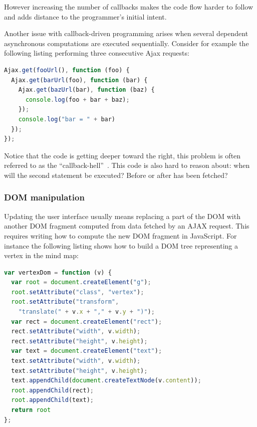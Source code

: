 \documentclass[american,english,runningheads]{llncs}
\begin{document}
However increasing the number of callbacks makes the code flow harder to follow and adds distance to the programmer's
initial intent.

Another issue with callback-driven programming arises when several dependent asynchronous computations are executed
sequentially. Consider for example the following listing performing three consecutive Ajax requests:

\begin{lstlisting}[language=JavaScript,label=async-callback-hell,caption=Sequential asynchronous calls]
Ajax.get(fooUrl(), function (foo) {
  Ajax.get(barUrl(foo), function (bar) {
    Ajax.get(bazUrl(bar), function (baz) {
      console.log(foo + bar + baz);
    });
    console.log("bar = " + bar)
  });
});
\end{lstlisting}

Notice that the code is getting deeper toward the right, this problem is often referred to as the
“callback-hell”~\cite{McKenna_Roy}. This code is also hard to reason about: when will the second 
statement be executed? Before or after  has been fetched?

\subsubsection{DOM manipulation}
\label{forest}

Updating the user interface usually means replacing a part of the DOM with another DOM fragment computed from data
fetched by an AJAX request. This requires writing how to compute the new DOM fragment in JavaScript. For instance
the following listing shows how to build a DOM tree representing a vertex in the mind map:

\begin{lstlisting}[language=JavaScript,label=dom-api,caption=DOM fragment creation using the native API]
var vertexDom = function (v) {
  var root = document.createElement("g");
  root.setAttribute("class", "vertex");
  root.setAttribute("transform",
    "translate(" + v.x + "," + v.y + ")");
  var rect = document.createElement("rect");
  rect.setAttribute("width", v.width);
  rect.setAttribute("height", v.height);
  var text = document.createElement("text");
  text.setAttribute("width", v.width);
  text.setAttribute("height", v.height);
  text.appendChild(document.createTextNode(v.content));
  root.appendChild(rect);
  root.appendChild(text);
  return root
};
\end{lstlisting}
\end{document}
